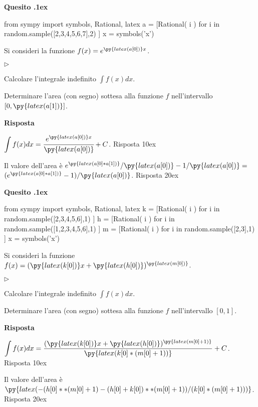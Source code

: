 \documentclass[11pt,twoside,a4paper]{article}
\newcommand{\mylabel}[1]{#1\hfill}
\renewenvironment{itemize}
  {\begin{list}{$\triangleright$}{%
   \setlength{\parskip}{0mm}
   \setlength{\topsep}{.4\baselineskip}
   \setlength{\rightmargin}{0mm}
   \setlength{\listparindent}{0mm}
   \setlength{\itemindent}{0mm}
   \setlength{\labelwidth}{2ex}
   \setlength{\itemsep}{.4\baselineskip}
   \setlength{\parsep}{0mm}
   \setlength{\partopsep}{0mm}
   \setlength{\labelsep}{1ex}
   \setlength{\leftmargin}{\labelwidth+\labelsep}
   \let\makelabel\mylabel}}{%
   \end{list}\vspace*{-1.3mm}}
\newcounter{quesito}
\newenvironment{question}{\bigskip\addtocounter{quesito}{1}\bigskip\bigskip\par\textbf{Quesito \thequesito.\kern1ex}}{\vspace{\parskip}}
\newenvironment{answer}{\par\textbf{Risposta\quad}}{\vspace{\parskip}}
\begin{document}
\begin{question}
\begin{pycode}
from sympy import symbols, Rational, latex
a = [Rational( i ) for i in random.sample([2,3,4,5,6,7],2) ]
x = symbols('x')
\end{pycode}
Si consideri la funzione $f(x) = e^{\py{latex(a[0])}x}$.
\begin{itemize}
\item[1.] Calcolare l'integrale indefinito $\displaystyle \int f(x) dx$.
\item[2.] Determinare l'area (con segno) sottesa alla funzione $f$ nell'intervallo $[0,\py{latex(a[1])}]$.
\end{itemize}
\begin{answer}

{\color{blue}
$\displaystyle \int f(x) dx = \cfrac{e^{\py{latex(a[0])}x}}{\py{latex(a[0])}} + C$.
\hfill Risposta 1\kern0ex}

\smallskip
{\color{blue} Il valore dell'area è} $e^{\py{latex(a[0]*a[1])}}/\py{latex(a[0])} - 1/\py{latex(a[0])}=$ {\color{blue}$(e^{\py{latex(a[0]*a[1])}}-1)/\py{latex(a[0])}$.
\hfill Risposta 2\kern0ex}

\end{answer}
\end{question}
\begin{question}
\begin{pycode}
from sympy import symbols, Rational, latex
k = [Rational( i ) for i in random.sample([2,3,4,5,6],1) ]
h = [Rational( i ) for i in random.sample([1,2,3,4,5,6],1) ]
m = [Rational( i ) for i in random.sample([2,3],1) ]
x = symbols('x')
\end{pycode}
Si consideri la funzione $f(x) = (\py{latex(k[0])}x+\py{latex(h[0])})^{\py{latex(m[0])}}$.
\begin{itemize}
\item[1.] Calcolare l'integrale indefinito $\displaystyle \int f(x) dx$.
\item[2.] Determinare l'area (con segno) sottesa alla funzione $f$ nell'intervallo $[0,1]$.
\end{itemize}
\begin{answer}

{\color{blue}
$\displaystyle \int f(x) dx = \dfrac{(\py{latex(k[0])}x+\py{latex(h[0])})^{\py{latex(m[0]+1)}}}{\py{latex(k[0]*(m[0]+1))}} + C$.
\hfill Risposta 1\kern0ex}

\smallskip
{\color{blue} Il valore dell'area è $\py{latex(-(h[0]**(m[0]+1)-(h[0]+k[0])**(m[0]+1))/(k[0]*(m[0]+1)))}$.
\hfill Risposta 2\kern0ex}

\end{answer}
\end{question}
\end{document}

